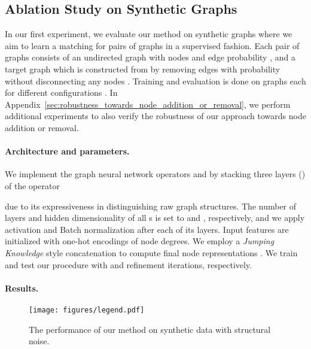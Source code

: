 \documentclass{article}
\begin{document}
\subsection{Ablation Study on Synthetic Graphs}\label{sub:ablation_study_on_synthetic_graphs}

In our first experiment, we evaluate our method on synthetic graphs where we aim to learn a matching for pairs of graphs in a supervised fashion.
Each pair of graphs consists of an undirected \citet{Erdos/Renyi/1959} graph  with  nodes and edge probability , and a target graph  which is constructed from  by removing edges with probability  without disconnecting any nodes \citep{Heimann/etal/2018}.
Training and evaluation is done on  graphs each for different configurations .
In Appendix~\ref{sec:robustness_towards_node_addition_or_removal}, we perform additional experiments to also verify the robustness of our approach towards node addition or removal.

\paragraph{Architecture and parameters.}

We implement the graph neural network operators  and  by stacking three layers () of the  operator  \citep{Xu/etal/2019b}

due to its expressiveness in distinguishing raw graph structures.
The number of layers and hidden dimensionality of all s is set to  and , respectively, and we apply  activation \citep{Glorot/etal/2011} and Batch normalization \citep{Ioffe/Szegedy/2015} after each of its layers.
Input features are initialized with one-hot encodings of node degrees.
We employ a \emph{Jumping Knowledge} style concatenation  \citep{Xu/etal/2018} to compute final node representations .
We train and test our procedure with  and  refinement iterations, respectively.

\paragraph{Results.}

\begin{figure}[t]
  \centering
  \texttt{[image: figures/legend.pdf]}
  \hspace{-0.4cm}
  \hspace{-0.4cm}
  \hspace{-0.4cm}
  \caption{The performance of our method on synthetic data with structural noise.}\label{fig:syn}
\end{figure}
\end{document}
